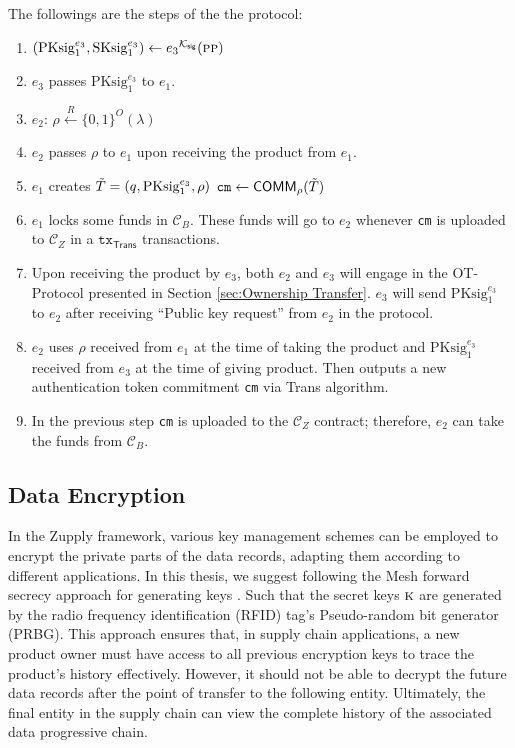 The followings are the steps of the the protocol:
\begin{enumerate}
    \item $(\text{PKsig}^{e_3}_1, \text{SKsig}^{e_3}_1) \leftarrow {e_3}^{\mathcal{K}_\mathsf{sig}}(\textsc{pp})$

    \item $e_3$ passes $\text{PKsig}^{e_3}_1$ to $e_1$.

    \item $e_2$: $\rho \xleftarrow{R} \{0, 1\}^O(\lambda)$

    \item $e_2$ passes $\rho$ to $e_1$ upon receiving the product from $e_1$.

    \item $e_1$ creates $\Tilde{T} = (q, \text{PKsig}^{e_3}_{1}, \rho)$ $\texttt{cm} \gets \mathsf{COMM}_\rho(\Tilde{T})$

    \item $e_1$ locks some funds in $\mathcal{C}_B$. These funds will go to $e_2$ whenever \texttt{cm} is uploaded to $\mathcal{C}_Z$ in a $\texttt{tx}_\mathsf{Trans}$ transactions.

    \item Upon receiving the product by $e_3$, both $e_2$ and $e_3$ will engage in the \textsf{OT-Protocol} presented in Section \ref{sec:Ownership Transfer}. $e_3$ will send $\text{PKsig}^{e_3}_1$ to $e_2$ after receiving ``Public key request'' from $e_2$ in the protocol.

    \item $e_2$ uses $\rho$ received from $e_1$ at the time of taking the product and  $\text{PKsig}^{e_3}_1$ received from $e_3$ at the time of giving product. Then outputs a new authentication token commitment \texttt{cm} via \textsf{Trans} algorithm.

    \item In the previous step \texttt{cm} is uploaded to the $\mathcal{C}_Z$ contract; therefore, $e_2$ can take the funds from $\mathcal{C}_B$.
    
\end{enumerate}

\subsection{Data Encryption}
\label{app:Data Encryption}
In the Zupply framework, various key management schemes can be employed to encrypt the private parts of the data records, adapting them according to different applications. In this thesis, we suggest following the Mesh forward secrecy approach for generating keys \cite{altawy2019mesh}. Such that the secret keys $\textsc{k}$ are generated by the radio frequency identification (RFID) tag's Pseudo-random bit generator (PRBG). This approach ensures that, in supply chain applications, a new product owner must have access to all previous encryption keys to trace the product's history effectively. However, it should not be able to decrypt the future data records after the point of transfer to the following entity. Ultimately, the final entity in the supply chain can view the complete history of the associated data progressive chain.


